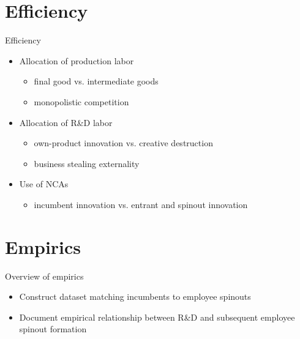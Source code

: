 \documentclass[english,usenames,dvipsnames,handout]{beamer}
\begin{document}
\section{Efficiency}

\begin{frame}
	\tableofcontents[currentsection]
\end{frame}


\begin{frame}{Efficiency}\label{efficiency}
	\hyperlink{welfare}{} 
	\medskip
	\begin{itemize}
		\item Allocation of production labor
		\begin{itemize}
			\item final good vs. intermediate goods
			\item monopolistic competition
		\end{itemize}
		\medskip
		\item Allocation of R\&D labor  
		\begin{itemize}
			\item own-product innovation vs. creative destruction 
			\item business stealing externality \hyperlink{misallocation_of_rd}{} 
		\end{itemize}
		\medskip
		\item Use of NCAs 
		\begin{itemize}
			\item incumbent innovation vs. entrant and spinout innovation  \hyperlink{misallocation_of_nca}{} 
		\end{itemize}
	\end{itemize}
\end{frame}

\section{Empirics}

\begin{frame}
\tableofcontents[currentsection]
\end{frame}

\begin{frame}{Overview of empirics}
	\begin{itemize}
		\item Construct dataset matching incumbents to employee spinouts
		\smallskip
		\item Document empirical relationship between R\&D and subsequent employee spinout formation
	\end{itemize}
\end{frame}
\end{document}
